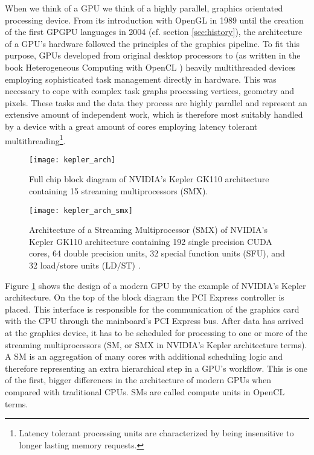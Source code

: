 When we think of a GPU we think of a highly parallel, graphics orientated processing device. From its introduction with OpenGL in 1989 until the creation of the first GPGPU languages in 2004 (cf. section \ref{sec:history}), the architecture of a GPU's hardware followed the principles of the graphics pipeline. To fit this purpose, GPUs developed from original desktop processors to (as written in the book Heterogeneous Computing with OpenCL \cite{opencl_book}) heavily multithreaded devices employing sophisticated task management directly in hardware. This was necessary to cope with complex task graphs processing vertices, geometry and pixels. These tasks and the data they process are highly parallel and represent an extensive amount of independent work, which is therefore most suitably handled by a device with a great amount of cores employing latency tolerant multithreading\footnote{Latency tolerant processing units are characterized by being insensitive to longer lasting memory requests.}.

\begin{figure}[h]
\centering
\texttt{[image: kepler\_arch]}
\caption{Full chip block diagram of NVIDIA's Kepler GK110 architecture containing 15 streaming multiprocessors (SMX). \cite{kepler_arch}}
\label{fig:kepler_arch}
\end{figure}

\begin{figure}[h]
\centering
\texttt{[image: kepler\_arch\_smx]}
\caption{Architecture of a Streaming Multiprocessor (SMX) of NVIDIA's Kepler GK110 architecture containing 192 single precision CUDA cores, 64 double precision units, 32 special function units (SFU), and 32 load/store units (LD/ST) \cite{kepler_arch}.}
\label{fig:kepler_arch_smx}
\end{figure}

Figure \ref{fig:kepler_arch} shows the design of a modern GPU by the example of NVIDIA's Kepler architecture. On the top of the block diagram the PCI Express controller is placed. This interface is responsible for the communication of the graphics card with the CPU through the mainboard's PCI Express bus. After data has arrived at the graphics device, it has to be scheduled for processing to one or more of the streaming multiprocessors (SM, or SMX in NVIDIA's Kepler architecture terms). A SM is an aggregation of many cores with additional scheduling logic and therefore representing an extra hierarchical step in a GPU's workflow. This is one of the first, bigger differences in the architecture of modern GPUs when compared with traditional CPUs. SMs are called compute units in OpenCL terms.

